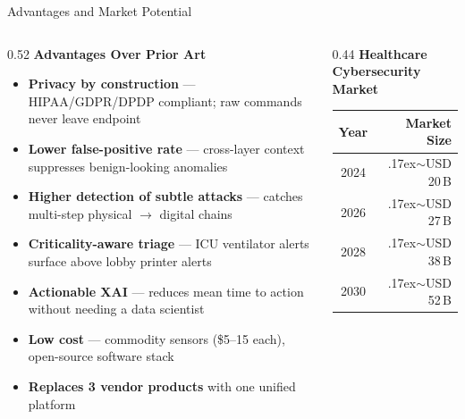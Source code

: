\documentclass[10pt, aspectratio=169]{beamer}
\begin{document}
\begin{frame}{Advantages and Market Potential}
  \begin{columns}[T]
    \begin{column}{0.52\textwidth}
      \textbf{\textcolor{patentblue}{Advantages Over Prior Art}}
      \begin{itemize}\small
        \item \textbf{Privacy by construction} — HIPAA/GDPR/DPDP compliant; raw commands never leave endpoint
        \item \textbf{Lower false-positive rate} — cross-layer context suppresses benign-looking anomalies
        \item \textbf{Higher detection of subtle attacks} — catches multi-step physical $\rightarrow$ digital chains
        \item \textbf{Criticality-aware triage} — ICU ventilator alerts surface above lobby printer alerts
        \item \textbf{Actionable XAI} — reduces mean time to action without needing a data scientist
        \item \textbf{Low cost} — commodity sensors (\$5--15 each), open-source software stack
        \item \textbf{Replaces 3 vendor products} with one unified platform
      \end{itemize}
    \end{column}
    \begin{column}{0.44\textwidth}
      \textbf{\textcolor{patentblue}{Healthcare Cybersecurity Market}}\\[4pt]
      \begin{table}
        \centering
        \footnotesize
        \begin{tabular}{@{}cr@{}}
          \toprule
          \textbf{Year} & \textbf{Market Size} \\
          \midrule
          2024 & \raise.17ex\hbox{$\scriptstyle\sim$}USD 20\,B \\
          2026 & \raise.17ex\hbox{$\scriptstyle\sim$}USD 27\,B \\
          2028 & \raise.17ex\hbox{$\scriptstyle\sim$}USD 38\,B \\
          2030 & \raise.17ex\hbox{$\scriptstyle\sim$}USD 52\,B \\
          \bottomrule
        \end{tabular}

\end{table}
\end{column}
\end{columns}
\end{frame}
\end{document}
